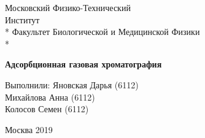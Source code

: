 \documentclass[12pt]{article}
\begin{document}
\begin{titlepage}
\newpage
\begin{center}
\vspace{1cm}%
\LARGE Московский Физико-Технический\\ Институт \\*
\vspace{5mm}
\large Факультет Биологической и Медицинской Физики\\*
\hrulefill %
\end{center}
\vspace{5em}
\begin{center}
\textbf{\huge Адсорбционная газовая хроматография} 
\end{center}
\vspace{20em}
\begin{flushright}
Выполнили: 
\hspace{1em}  
Яновская Дарья (6112)\\
Михайлова Анна (6112)\\
Колосов Семен (6112)\\
\vspace{1.5em}
\end{flushright}
\vspace{\fill}
\begin{center}
Москва 2019
\end{center}
\end{titlepage}
 
\newpage
\end{document}
